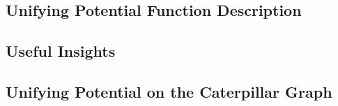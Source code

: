 \subsection{Unifying Potential Function Description}
\label{sec:unifyingPotentialDescription}


\subsection{Useful Insights}
\label{sec:usefulInsights}


\subsection{Unifying Potential on the Caterpillar Graph}
\label{sec:cat}
